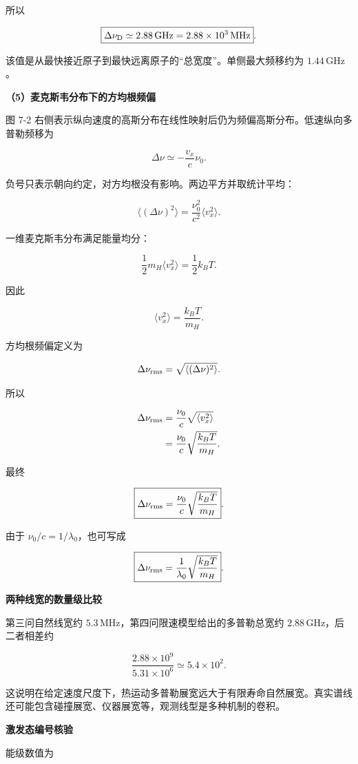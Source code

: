 \documentclass[12pt,a4paper,UTF8]{ctexart}
\begin{document}
所以

\[
\boxed{
\Delta\nu_{\rm D}\simeq2.88\,\mathrm{GHz}
=2.88\times10^3\,\mathrm{MHz}
}.
\]

该值是从最快接近原子到最快远离原子的``总宽度''。单侧最大频移约为
\(1.44\,\mathrm{GHz}\)。

\textbf{（5）麦克斯韦分布下的方均根频偏}

图 7-2
右侧表示纵向速度的高斯分布在线性映射后仍为频偏高斯分布。低速纵向多普勒频移为

\[
\Delta\nu\simeq-\frac{v_x}{c}\nu_0.
\]

负号只表示朝向约定，对方均根没有影响。两边平方并取统计平均：

\[
\langle(\Delta\nu)^2\rangle
=\frac{\nu_0^2}{c^2}\langle v_x^2\rangle.
\]

一维麦克斯韦分布满足能量均分：

\[
\frac12m_H\langle v_x^2\rangle=\frac12k_BT.
\]

因此

\[
\langle v_x^2\rangle=\frac{k_BT}{m_H}.
\]

方均根频偏定义为

\[
\Delta\nu_{\rm rms}
=\sqrt{\langle(\Delta\nu)^2\rangle}.
\]

所以

\[
\begin{aligned}
\Delta\nu_{\rm rms}
&=\frac{\nu_0}{c}\sqrt{\langle v_x^2\rangle}\\
&=\frac{\nu_0}{c}\sqrt{\frac{k_BT}{m_H}}.
\end{aligned}
\]

最终

\[
\boxed{
\Delta\nu_{\rm rms}
=\frac{\nu_0}{c}\sqrt{\frac{k_BT}{m_H}}
}.
\]

由于 \(\nu_0/c=1/\lambda_0\)，也可写成

\[
\boxed{
\Delta\nu_{\rm rms}
=\frac1{\lambda_0}\sqrt{\frac{k_BT}{m_H}}
}.
\]

\textbf{两种线宽的数量级比较}

第三问自然线宽约 \(5.3\,\mathrm{MHz}\)，第四问限速模型给出的多普勒总宽约
\(2.88\,\mathrm{GHz}\)，后二者相差约

\[\frac{2.88\times10^9}{5.31\times10^6}\simeq5.4\times10^2.\]

这说明在给定速度尺度下，热运动多普勒展宽远大于有限寿命自然展宽。真实谱线还可能包含碰撞展宽、仪器展宽等，观测线型是多种机制的卷积。

\textbf{激发态编号核验}

能级数值为
\end{document}
